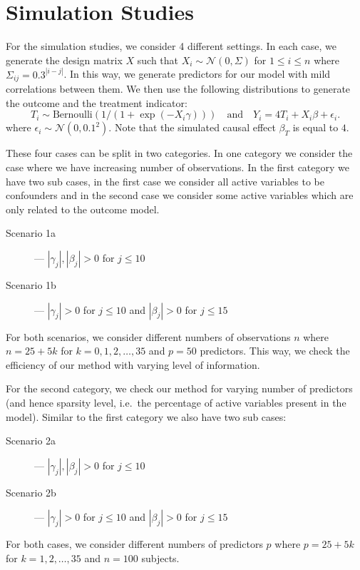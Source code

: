 \documentclass[preprint,12pt]{elsarticle}
\begin{document}
\section{Simulation Studies}\label{sec:sim}

For the simulation studies, we consider 4 different settings. In each
case, we generate the design matrix $X$ such that $X_i\sim\mathcal{N}(0, \Sigma)$
for $1\le i\le n$ where $\Sigma_{ij} = 0.3^{|i-j|}$. In this way, we 
generate predictors for our model with mild correlations between them.
We then use the following distributions to generate the outcome and
the treatment indicator: 
\begin{equation}
    T_i \sim \text{Bernoulli}\left(1/(1+\exp(-X_i\gamma))\right)
    \quad\text{and}\quad
    Y_i = 4T_i + X_i\beta + \epsilon_i.
\end{equation}
where $\epsilon_i\sim\mathcal{N}(0,0.1^2)$.
Note that the simulated causal effect $\beta_T$ is equal to $4$.

These four cases can be split in two categories. In one category we consider the
case where we have increasing number of observations. In the first category we have two
sub cases, in the first case we consider all active variables to be confounders
and in the second case we consider some active variables which are only related to
the outcome model. 
\begin{description}
    \item[Scenario 1a] --- $|\gamma_j|, |\beta_j|>0$ for $j\le 10$
    \item[Scenario 1b] --- $|\gamma_j|>0$ for $j\le 10$ and $|\beta_j|>0$ for $j\le 15$
\end{description}
For both
scenarios, we consider different numbers of observations $n$ where
$n=25+ 5k$ for $k=0,1,2,\dots,35$ and $p=50$
predictors. This way, we check the efficiency of our method with varying level of information.

For the second category, we check our method for varying number of predictors 
(and hence sparsity level, i.e.\ the percentage of active variables present in the model).
Similar to the first category we also have two sub cases:
\begin{description}
    \item[Scenario 2a] --- $|\gamma_j|, |\beta_j|>0$ for $j\le 10$
    \item[Scenario 2b] --- $|\gamma_j|>0$ for $j\le 10$ and $|\beta_j|>0$ for $j\le 15$
\end{description}
For both
cases, we consider different numbers of predictors $p$ where
$p=25+ 5k$ for $k=1,2,\dots,35$ and $n=100$
subjects.
\end{document}
